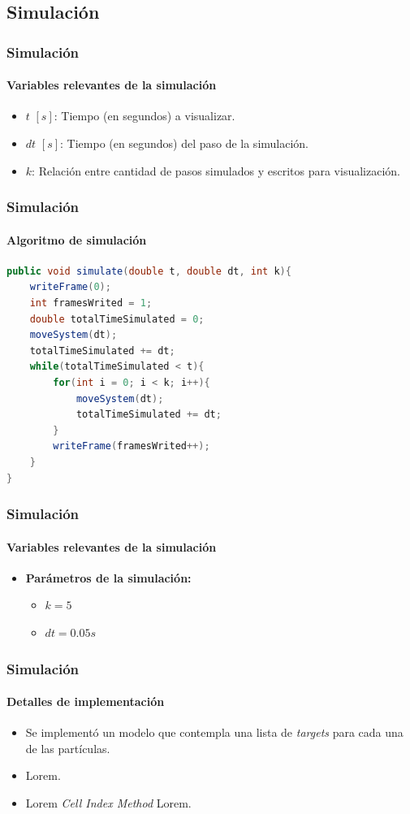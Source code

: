 \documentclass[hyperref={pdfpagelayout=SinglePage}]{beamer}
\begin{document}
\subsection{Simulación}

\begin{frame}
\frametitle{Simulación}
\framesubtitle{Variables relevantes de la simulación}
\begin{itemize}
	\item $t$ $[s]$: Tiempo (en segundos) a visualizar.
	\item $dt$ $[s]$: Tiempo (en segundos) del paso de la simulación.
	\item $k$: Relación entre cantidad de pasos simulados y escritos para visualización.
\end{itemize}
\end{frame}

\begin{frame}[fragile]
\frametitle{Simulación}
\framesubtitle{Algoritmo de simulación}
\begin{lstlisting}[language=Java, caption = Algoritmo de simulación]
public void simulate(double t, double dt, int k){
	writeFrame(0);
	int framesWrited = 1;
	double totalTimeSimulated = 0;
	moveSystem(dt);
	totalTimeSimulated += dt;
	while(totalTimeSimulated < t){
		for(int i = 0; i < k; i++){
			moveSystem(dt);
			totalTimeSimulated += dt;
		}
		writeFrame(framesWrited++);
	}
}
\end{lstlisting}
\end{frame}

\begin{frame}
\frametitle{Simulación}
\framesubtitle{Variables relevantes de la simulación}
\begin{itemize}
	\item \textbf{Parámetros de la simulación:}
	\begin{itemize}
		\item $k = 5$
		\item $dt = 0.05s$
	\end{itemize}
\end{itemize}
\end{frame}

\begin{frame}
\frametitle{Simulación}
\framesubtitle{Detalles de implementación}
\begin{itemize}
	\item Se implementó un modelo que contempla una lista de \textit{targets} para cada una de las partículas.
	\item Lorem.
	\item Lorem \textit{Cell Index Method} Lorem.
\end{itemize}
\end{frame}
\end{document}
